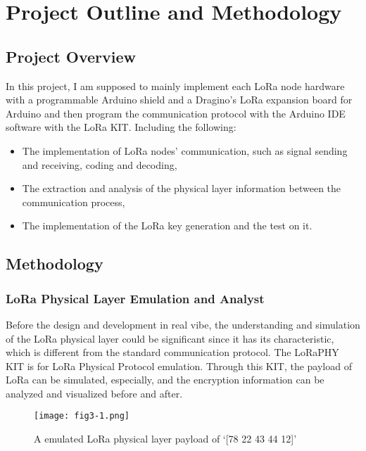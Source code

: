 
\chapter{Project Outline and Methodology}

\section{Project Overview}
In this project, I am supposed to mainly implement each LoRa node hardware with a programmable Arduino shield and a Dragino’s LoRa expansion board for Arduino and then program the communication protocol with the Arduino IDE software with the LoRa KIT. Including the following:
\begin{itemize}
\item The implementation of LoRa nodes’ communication, such as signal sending and receiving, coding and decoding,
\item The extraction and analysis of the physical layer information between the communication process,
\item The implementation of the LoRa key generation and the test on it.
\end{itemize}

\section{Methodology}
\subsection{LoRa Physical Layer Emulation and Analyst}
Before the design and development in real vibe, the understanding and simulation of the LoRa physical layer could be significant since it has its characteristic, which is different from the standard communication protocol.
The LoRaPHY KIT is for LoRa Physical Protocol emulation\cite{10.1145/3546869}. Through this KIT, the payload of LoRa can be simulated, especially, and the encryption information can be analyzed and visualized before and after.
\begin{figure}
  \centering
  \texttt{[image: fig3-1.png]}
  \caption{A emulated LoRa physical layer payload of ‘[78 22 43 44 12]’}
  \label{fig:3-1}
\end{figure}

